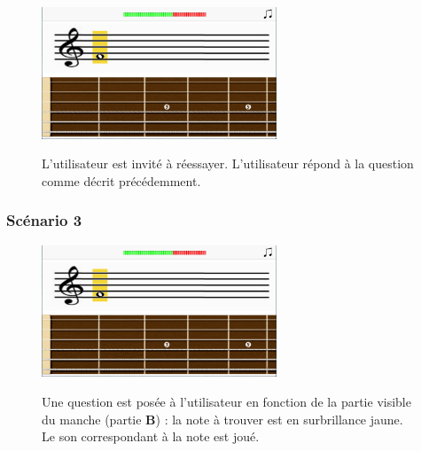 \documentclass{scrreprt}
\begin{document}
\begin{figure}[!ht]
  \begin{minipage}{0.55\linewidth}
    \includegraphics[width=7cm]{images/maquette_usecase/portee/question_une_note_1.png}
  \end{minipage}\hfill
 \begin{minipage}{0.5\linewidth}
  {L'utilisateur est invité à réessayer. L'utilisateur répond à la question comme décrit précédemment.}
   \end{minipage}
\end{figure}

\bigbreak

\newpage


\subsubsection{Scénario 3}
\bigbreak

\bigbreak
\begin{figure}[!ht]
  \begin{minipage}{0.55\linewidth}
    \includegraphics[width=7cm]{images/maquette_usecase/portee/question_une_note_1.png}
  \end{minipage}\hfill
  \begin{minipage}{0.5\linewidth}
  {Une question est posée à l'utilisateur en fonction de la partie visible du manche (partie \textbf{B}) : la note à trouver est en surbrillance jaune. 
  Le son correspondant à la note est joué.}
   \end{minipage}
\end{figure}
\end{document}
